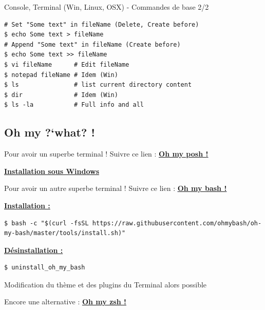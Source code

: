 \documentclass[a4paper,11pt]{beamer}
\begin{document}
\begin{frame}[containsverbatim]

\begin{block}{Console, Terminal (Win, Linux, OSX) - Commandes de base 2/2}
\begin{lstlisting}
# Set "Some text" in fileName (Delete, Create before)
$ echo Some text > fileName
# Append "Some text" in fileName (Create before)
$ echo Some text >> fileName
$ vi fileName      # Edit fileName
$ notepad fileName # Idem (Win)
$ ls               # list current directory content
$ dir              # Idem (Win)
$ ls -la           # Full info and all
\end{lstlisting}
\end{block}
\end{frame}


\subsection{Oh my ?`what? !}
\begin{frame}[containsverbatim]

\begin{block}{Pour avoir un superbe terminal !}
\centering
Suivre ce lien : \faThumbsUp\hspace{0.25cm}
\textcolor{blue}{\textbf{\underline{\href{https://ohmyposh.dev/}{Oh my posh !}}}}\hspace{0.25cm}\faThumbsUp

\textcolor{blue}{\textbf{\underline{\href{https://ohmyposh.dev/docs/installation/windows}{Installation sous Windows}}}}
\end{block}

\begin{block}{Pour avoir un  autre superbe terminal !}
\centering
Suivre ce lien :
\textcolor{blue}{\textbf{\underline{\href{https://github.com/ohmybash/oh-my-bash}{Oh my bash !}}}}

\justifying
\textbf{\underline{Installation :}}
\begin{lstlisting}
$ bash -c "$(curl -fsSL https://raw.githubusercontent.com/ohmybash/oh-my-bash/master/tools/install.sh)"
\end{lstlisting}
\textbf{\underline{Désinstallation :}}
\begin{lstlisting}
$ uninstall_oh_my_bash
\end{lstlisting}
Modification du thème et des plugins du Terminal alors possible
\end{block}

\centering
Encore une alternative : \textcolor{blue}{\textbf{\underline{\href{https://ohmyz.sh/}{Oh my zsh !}}}}


\end{frame}
\end{document}
